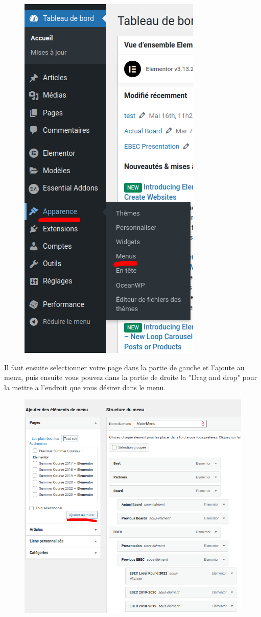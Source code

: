 \documentclass[12pt]{article}
\begin{document}
		\begin{figure}[htp]
			\centering
			\includegraphics[width=.5\textwidth]{img/Menu.png}
		\end{figure}
		
		Il faut ensuite selectionner votre page dans la partie de gauche et l'ajoute au menu, puis ensuite vous pouvez dans la partie de droite la "Drag and drop" pour la mettre a l'endroit que vous désirer dans le menu.
		
		\begin{figure}[htp]
			\centering
			\includegraphics[width=.7\textwidth]{img/Menu1.png}
		\end{figure}
		\vfill
		
\end{document}
